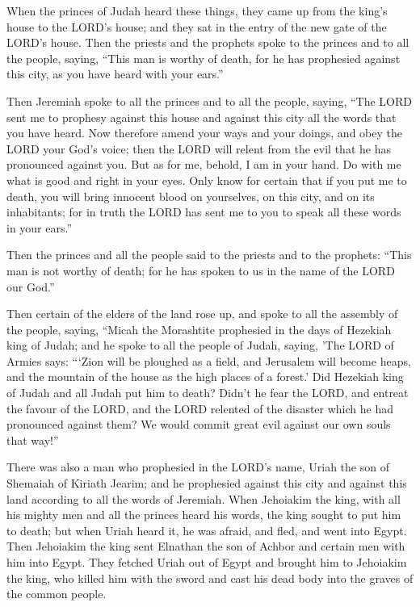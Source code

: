  When the princes of Judah heard these things, they came
up from the king's house to the LORD's house; and they sat in the entry
of the new gate of the LORD's house.  Then the priests
and the prophets spoke to the princes and to all the people, saying,
``This man is worthy of death, for he has prophesied against this city,
as you have heard with your ears.''

 Then Jeremiah spoke to all the princes and to all the
people, saying, ``The LORD sent me to prophesy against this house and
against this city all the words that you have heard.  Now
therefore amend your ways and your doings, and obey the LORD your God's
voice; then the LORD will relent from the evil that he has pronounced
against you.  But as for me, behold, I am in your hand.
Do with me what is good and right in your eyes.  Only
know for certain that if you put me to death, you will bring innocent
blood on yourselves, on this city, and on its inhabitants; for in truth
the LORD has sent me to you to speak all these words in your ears.''

 Then the princes and all the people said to the priests
and to the prophets: ``This man is not worthy of death; for he has
spoken to us in the name of the LORD our God.''

 Then certain of the elders of the land rose up, and
spoke to all the assembly of the people, saying,  ``Micah
the Morashtite prophesied in the days of Hezekiah king of Judah; and he
spoke to all the people of Judah, saying, 'The LORD of Armies says:
```Zion will be ploughed as a field, and Jerusalem will become heaps,
and the mountain of the house as the high places of a forest.'
 Did Hezekiah king of Judah and all Judah put him to
death? Didn't he fear the LORD, and entreat the favour of the LORD, and
the LORD relented of the disaster which he had pronounced against them?
We would commit great evil against our own souls that way!''

 There was also a man who prophesied in the LORD's name,
Uriah the son of Shemaiah of Kiriath Jearim; and he prophesied against
this city and against this land according to all the words of Jeremiah.
 When Jehoiakim the king, with all his mighty men and all
the princes heard his words, the king sought to put him to death; but
when Uriah heard it, he was afraid, and fled, and went into Egypt.
 Then Jehoiakim the king sent Elnathan the son of Achbor
and certain men with him into Egypt.  They fetched Uriah
out of Egypt and brought him to Jehoiakim the king, who killed him with
the sword and cast his dead body into the graves of the common people.

